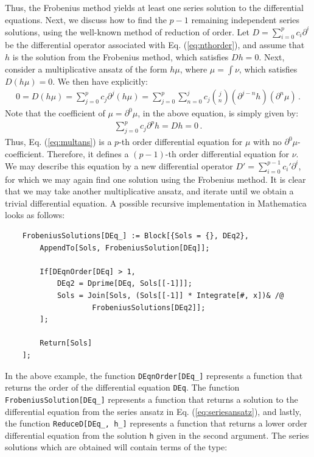 \documentclass{article}
\begin{document}
Thus, the Frobenius method yields at least one series solution to the differential equations. Next, we discuss how to find the $p-1$ remaining independent series solutions, using the well-known method of reduction of order. Let $D = \sum_{i=0}^p c_i \partial^i$ be the differential operator associated with Eq. (\ref{eq:nthorder}), and assume that $h$ is the solution from the Frobenius method, which satisfies $D h = 0$. Next, consider a multiplicative ansatz of the form $h\mu$, where $\mu = \int\nu$, which satisfies $D(h\mu)=0$. We then have explicitly:
\begin{align}
    \label{eq:multans}
    0 = D \left(h  \mu\right) = \sum_{j=0}^p c_j \partial^j \left(h  \mu\right) = \sum_{j=0}^p \sum_{n=0}^j c_j  {j\choose n} (\partial^{j-n} h) (\partial^{n} \mu)\,.
\end{align}
Note that the coefficient of $\mu = \partial^0\mu$, in the above equation, is simply given by:
\begin{align}
    \sum_{j=0}^p c_j \partial^{p} h = D h = 0\,.
\end{align}
Thus, Eq. (\ref{eq:multans}) is a $p$-th order differential equation for $\mu$ with no $\partial^0 \mu$-coefficient. Therefore, it defines a $(p-1)$-th order differential equation for $\nu$. We may describe this equation by a new differential operator $D' = \sum_{i=0}^{p-1} c_{i}' \partial^i$, for which we may again find one solution using the Frobenius method. It is clear that we may take another multiplicative ansatz, and iterate until we obtain a trivial differential equation. A possible recursive implementation in Mathematica looks as follows:
\begin{verbatim}
    FrobeniusSolutions[DEq_] := Block[{Sols = {}, DEq2},
        AppendTo[Sols, FrobeniusSolution[DEq]];
        
        If[DEqnOrder[DEq] > 1,  
            DEq2 = Dprime[DEq, Sols[[-1]]];
            Sols = Join[Sols, (Sols[[-1]] * Integrate[#, x])& /@ 
                    FrobeniusSolutions[DEq2]];
        ];
        
        Return[Sols]
    ];
\end{verbatim}
In the above example, the function \texttt{DEqnOrder[DEq\_]} represents a function that returns the order of the differential equation \texttt{DEq}. The function \texttt{FrobeniusSolution[DEq\_]} represents a function that returns a solution to the differential equation from the series ansatz in Eq. (\ref{eq:seriesansatz}), and lastly, the function \texttt{ReduceD[DEq\_, h\_]} represents a function that returns a lower order differential equation from the solution \texttt{h} given in the second argument. The series solutions which are obtained will contain terms of the type:
\end{document}
